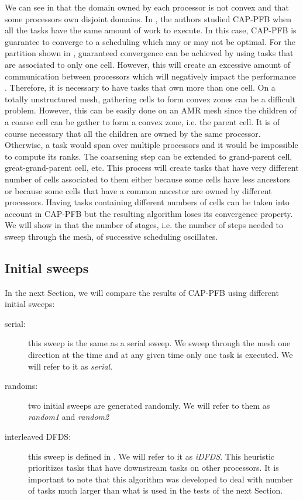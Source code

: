 \documentclass{mc2015}
\renewcommand{\(}{\left(}
\renewcommand{\)}{\right)}
\renewcommand{\[}{\left[}
\renewcommand{\]}{\right]}
\begin{document}
We can see in  that the domain owned by each processor is not
convex and that some
processors own disjoint domains. In \cite{Mo2014}, the authors studied CAP-PFB
when all the tasks have the same amount of work to execute. In this case,
CAP-PFB is guarantee to converge to a scheduling which may or may not be
optimal. For the partition shown in , guaranteed convergence can be achieved by using
tasks that are associated to only one cell. However, this will create an
excessive amount of communication between processors which will negatively impact the performance
\cite{Pautz2002}. Therefore, it is necessary to have tasks that own more than
one cell. On a totally unstructured mesh, gathering cells to form convex zones
can be a difficult problem. However, this can be easily done on an AMR mesh since the
children of a coarse cell can be gather to form a convex zone, i.e. the parent
cell. It is of course necessary that all the children are owned by the same
processor. Otherwise, a task would span over multiple processors and
it would be impossible to compute its ranks. The coarsening step 
can be extended to grand-parent cell, great-grand-parent cell, etc. This process will create
tasks that have very different number of cells associated to them either
because some cells have less ancestors or because some cells that have a common
ancestor are owned by different processors. Having tasks containing different
numbers of cells can be taken into account in CAP-PFB but the resulting
algorithm loses its convergence property. We will show in  that
the number of stages, i.e. the number of steps needed to sweep through the mesh,
of successive scheduling oscillates.

\subsection{Initial sweeps}

In the next Section, we will compare the results of CAP-PFB using different initial sweeps:
\begin{description}
  \item[serial:] this sweep is the same as a serial sweep. We sweep through the
    mesh one direction at the time and at any given time only one task is
    executed. We will refer to it as \emph{serial}.
  \item[randoms:] two initial sweeps are generated randomly. We will refer to
    them as \emph{random1} and \emph{random2}
  \item[interleaved DFDS:] this sweep is defined in \cite{Pautz2002}. We will
    refer to it as \emph{iDFDS}. This heuristic prioritizes tasks that have
    downstream tasks on other processors. It is important to note that this
    algorithm was developed to deal with number of tasks much larger than what
    is used in the tests of the next Section.
\end{description}
\end{document}

